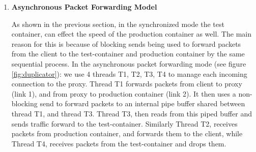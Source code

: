 \begin{enumerate}[leftmargin=*]

\item \textbf{Asynchronous Packet Forwarding Model}

As shown in the previous section, in the synchronized mode the test container, can effect the speed of the production container as well. 
The main reason for this is because of blocking sends being used to forward packets from the client to the test-container and production container by the same sequential process.
In the asynchronous packet forwarding mode (see figure \ref{fig:duplicator}): we use 4 threads T1, T2, T3, T4 to manage each incoming connection to the proxy.
Thread T1 forwards packets from client to proxy (link 1), and from proxy to production container (link 2). 
It then uses a non-blocking send to forward packets to an internal pipe buffer shared between thread T1, and thread T3. 
Thread T3, then reads from this piped buffer and sends traffic forward to the test-container. 
Similarly Thread T2, receives packets from production container, and forwards them to the client, while Thread T4, receives packets from the test-container and drops them.


\end{enumerate}
